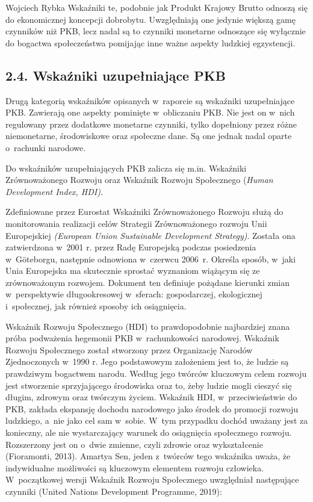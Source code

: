 \begin{artplenv}{Wojciech Rybka}
Wskaźniki te, podobnie jak Produkt Krajowy Brutto odnoszą się do ekonomicznej koncepcji dobrobytu. Uwzględniają one
jedynie większą gamę czynników niż PKB, lecz nadal są to czynniki monetarne odnoszące się wyłącznie do bogactwa
społeczeństwa pomijając inne ważne aspekty ludzkiej egzystencji.

\subsection{2.4. Wskaźniki uzupełniające PKB}
Drugą kategorią wskaźników opisanych w~raporcie są wskaźniki uzupełniające PKB. Zawierają one aspekty
pominięte w~obliczaniu PKB. Nie jest on w~nich regulowany przez dodatkowe monetarne czynniki, tylko dopełniony przez różne
niemonetarne, środowiskowe oraz społeczne dane. Są one jednak nadal oparte o~rachunki narodowe.

Do wskaźników uzupełniających PKB zalicza się m.in. Wskaźniki Zrównoważonego Rozwoju oraz Wskaźnik Rozwoju Społecznego
(\textit{Human Development Index, HDI).}

Zdefiniowane przez Eurostat Wskaźniki Zrównoważonego Rozwoju służą do monitorowania realizacji celów Strategii
Zrównoważonego rozwoju Unii Europejskiej \textit{(European Union Sustainable Development Strategy)}. Została ona
zatwierdzona w~2001 r. przez Radę Europejską podczas posiedzenia w~Göteborgu, następnie odnowiona w~czerwcu 2006~r.
Określa sposób, w~jaki Unia Europejska ma skutecznie sprostać wyznaniom wiążącym się ze zrównoważonym rozwojem.
Dokument ten definiuje pożądane kierunki zmian w~perspektywie długookresowej w~sferach: gospodarczej,
ekologicznej i~społecznej, jak również sposoby ich osiągnięcia. 

Wskaźnik Rozwoju Społecznego (HDI) to prawdopodobnie najbardziej znana próba podważenia hegemonii PKB w~rachunkowości
narodowej. Wskaźnik Rozwoju Społecznego został stworzony przez Organizację Narodów Zjednoczonych w~1990 r. Jego
podstawowym założeniem jest to, że ludzie są prawdziwym bogactwem narodu. Według jego twórców kluczowym celem rozwoju
jest stworzenie sprzyjającego środowiska oraz to, żeby ludzie mogli cieszyć się długim, zdrowym oraz twórczym życiem.
Wskaźnik HDI, w~przeciwieństwie do PKB, zakłada ekspansję dochodu narodowego jako środek do promocji rozwoju ludzkiego,
a~nie jako cel sam w~sobie. W~tym przypadku dochód uważany jest za konieczny, ale nie wystarczający warunek do
osiągnięcia społecznego rozwoju. Rozszerzony jest on o~dwie zmienne, czyli zdrowie oraz wykształcenie
\label{ref:RNDClmU8TrXre}(Fioramonti, 2013). Amartya Sen, jeden z~twórców tego wskaźnika uważa, że indywidualne
możliwości są kluczowym elementem rozwoju człowieka. W~początkowej wersji Wskaźnik Rozwoju Społecznego uwzględniał
następujące czynniki \label{ref:RND7MCVham9pF}(United Nations Development Programme, 2019):


\end{artplenv}
